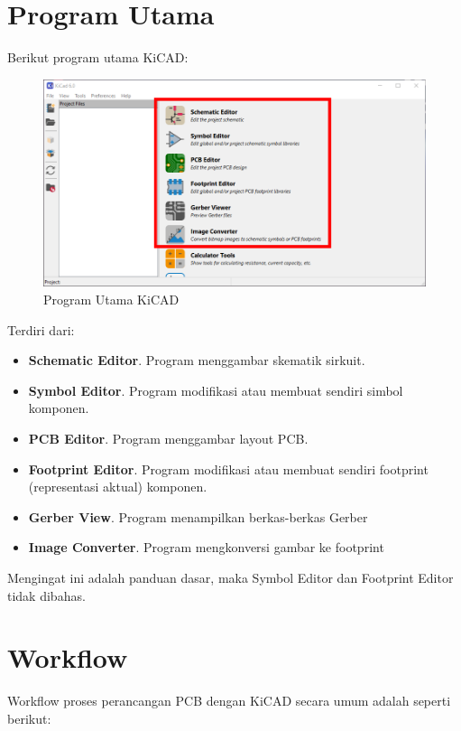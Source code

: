 \documentclass[12pt]{book}
\begin{document}
	\section{Program Utama}

	Berikut program utama KiCAD:

	\begin{figure}[!ht]
		\centering
		\includegraphics[width=\textwidth]{images/main/kicad_main}
		\caption{Program Utama KiCAD}
	\end{figure}

	Terdiri dari:
	\begin{itemize}
		\item \textbf{Schematic Editor}. Program menggambar skematik sirkuit.
		\item \textbf{Symbol Editor}. Program modifikasi atau membuat sendiri simbol komponen.
		\item \textbf{PCB Editor}. Program menggambar layout PCB.
		\item \textbf{Footprint Editor}. Program modifikasi atau membuat sendiri footprint (representasi aktual) komponen.
		\item \textbf{Gerber View}. Program menampilkan berkas-berkas Gerber
		\item \textbf{Image Converter}. Program mengkonversi gambar ke footprint
	\end{itemize}

	Mengingat ini adalah panduan dasar, maka Symbol Editor dan Footprint Editor tidak dibahas.

	\newpage
	\section{Workflow}

	Workflow proses perancangan PCB dengan KiCAD secara umum adalah seperti berikut:
\end{document}
